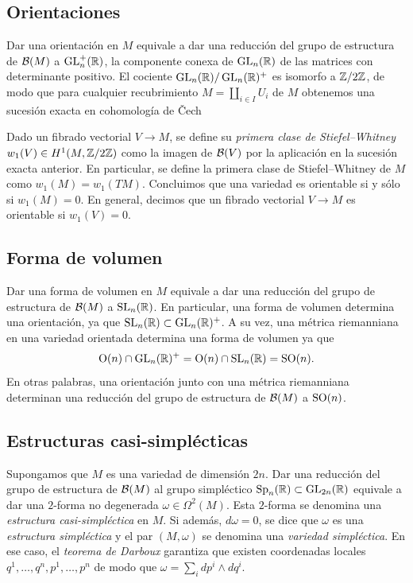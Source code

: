 \documentclass[11pt,a4paper]{amsbook}
\theoremstyle{remark} \newtheorem{rmk}[subsection]{Observación}
\theoremstyle{definition} \newtheorem{defn}[subsection]{Definición}
\theoremstyle{definition} \newtheorem{ex}[subsection]{Ejemplo}
\theoremstyle{definition} \newtheorem{ej}[subsection]{Ejercicio}
\begin{document}
\subsection{Orientaciones} Dar una orientación en $M$ equivale a dar una reducción del grupo de estructura de $\mathcal B(M)$ a $\operatorname{GL}_n^+(\mathbb R)$, la componente conexa de $\operatorname{GL}_n(\mathbb R)$ de las matrices con determinante positivo. El cociente $\operatorname{GL}_n(\mathbb R)/\operatorname{GL}_n(\mathbb R)^+$ es isomorfo a $\mathbb Z/2\mathbb Z$, de modo que para cualquier recubrimiento $M=\coprod_{i\in I} U_i$ de $M$ obtenemos una sucesión exacta en cohomología de \v{C}ech
\begin{center}
\end{center}

Dado un fibrado vectorial $V\rightarrow M$, se define su \emph{primera clase de Stiefel--Whitney} $w_1(V)\in H^1(M,\mathbb Z/2\mathbb Z)$ como la imagen de $\mathcal B(V)$ por la aplicación en la sucesión exacta anterior.  En particular, se define la primera clase de Stiefel--Whitney de $M$ como $w_1(M)=w_1(TM)$. Concluimos que una variedad es orientable si y sólo si $w_1(M)=0$. En general, decimos que un fibrado vectorial $V\rightarrow M$ es orientable si $w_1(V)=0$.

\subsection{Forma de volumen} Dar una forma de volumen en $M$ equivale a dar una reducción del grupo de estructura de $\mathcal B(M)$ a $\mathrm{SL}_n(\mathbb R)$. En particular, una forma de volumen determina una orientación, ya que $\mathrm{SL}_n(\mathbb R)\subset \operatorname{GL}_n(\mathbb R)^+$. A su vez, una métrica riemanniana en una variedad orientada determina una forma de volumen ya que \[\operatorname{O}(n) \cap \operatorname{GL}_n(\mathbb R)^+=\operatorname{O}(n)\cap \mathrm{SL}_n(\mathbb R)= \operatorname{SO}(n).\]
En otras palabras, una orientación junto con una métrica riemanniana determinan una reducción del grupo de estructura de $\mathcal B(M)$ a $\operatorname{SO}(n)$.

\subsection{Estructuras casi-simplécticas} Supongamos que $M$ es una variedad de dimensión $2n$. Dar una reducción del grupo de estructura de $\mathcal B(M)$ al grupo simpléctico $\mathrm{Sp}_n(\mathbb R)\subset \operatorname{GL}_{2n}(\mathbb R)$ equivale a dar una $2$-forma no degenerada $\omega \in \Omega^2(M)$. Esta $2$-forma se denomina una \emph{estructura casi-simpléctica} en $M$. Si además, $d\omega =0$, se dice que $\omega$ es una \emph{estructura simpléctica} y el par $(M,\omega)$ se denomina una \emph{variedad simpléctica}. En ese caso, el \emph{teorema de Darboux} garantiza que existen coordenadas locales $q^1,\dots,q^n, p^1,\dots,p^n$ de modo que $\omega = \sum_i dp^i \wedge dq^i$.
\end{document}
